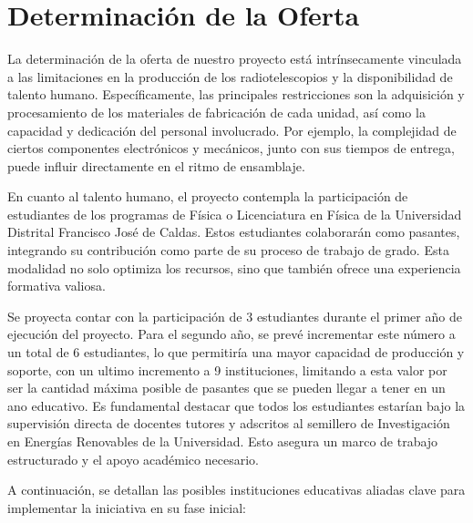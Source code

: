 \section{Determinación de la Oferta}%
\label{sec:Determinación de la Oferta}

La determinación de la oferta de nuestro proyecto está intrínsecamente
vinculada a las limitaciones en la producción de los radiotelescopios y la
disponibilidad de talento humano.
Específicamente, las principales restricciones son la adquisición y
procesamiento de los materiales de fabricación de cada unidad, así como la
capacidad y dedicación del personal involucrado.
Por ejemplo, la complejidad de ciertos componentes electrónicos y mecánicos,
junto con sus tiempos de entrega, puede influir directamente en el ritmo de
ensamblaje.

En cuanto al talento humano, el proyecto contempla la participación de
estudiantes de los programas de Física o Licenciatura en Física de la
Universidad Distrital Francisco José de Caldas.
Estos estudiantes colaborarán como pasantes, integrando su contribución como
parte de su proceso de trabajo de grado.
Esta modalidad no solo optimiza los recursos, sino que también ofrece una
experiencia formativa valiosa.

Se proyecta contar con la participación de 3 estudiantes durante el primer
año de ejecución del proyecto.
Para el segundo año, se prevé incrementar este número a un total de 6
estudiantes, lo que permitiría una mayor capacidad de producción y soporte,
con un ultimo incremento a 9 instituciones, limitando a esta valor por ser
la cantidad máxima posible de pasantes que se pueden llegar a tener en un
ano educativo.
Es fundamental destacar que todos los estudiantes estarían bajo la supervisión
directa de docentes tutores y adscritos al semillero de Investigación en
Energías Renovables de la Universidad.
Esto asegura un marco de trabajo estructurado y el apoyo académico necesario.

A continuación, se detallan las posibles instituciones educativas aliadas clave
para implementar la iniciativa en su fase inicial:

